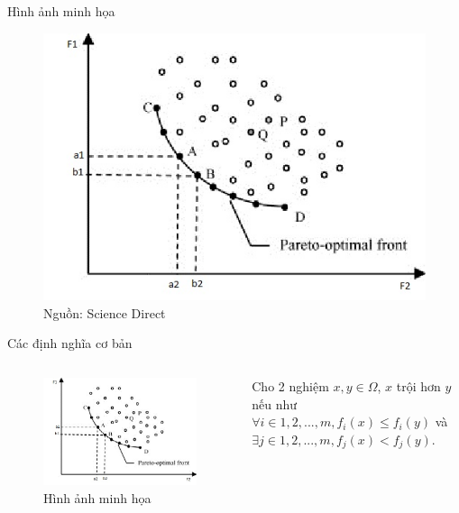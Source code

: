 \documentclass{beamer}
\begin{document}
    \begin{frame}{Hình ảnh minh họa}
        \begin{figure}
        \includegraphics[scale = 0.6]{paretofront.jpg}
        \caption{Nguồn: Science Direct}
        \end{figure}
    \end{frame}
    \begin{frame}{Các định nghĩa cơ bản}
        \begin{columns}
        \begin{figure}
            \centering
            \includegraphics[scale = 0.5]{paretofront.jpg}
            \caption{Hình ảnh minh họa}
            \label{fig:my_label}
        \end{figure}
        \pause
        Cho 2 nghiệm $x,y \in \Omega $, $x$ trội hơn $y$ nếu như $\forall i \in {1,2,...,m}, f_{i}(x) \leq f_{i}(y)$ và $ \exists j \in {1,2,...,m}, f_{j}(x) < f_{j}(y)$. 
        \end{columns}
    \end{frame}
\end{document}
